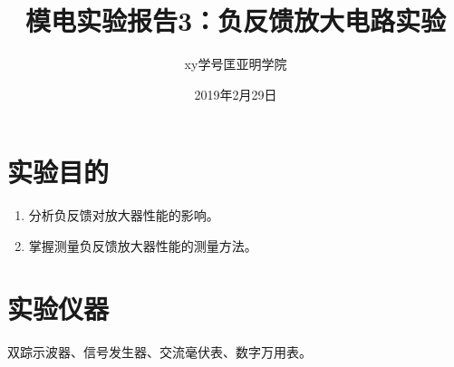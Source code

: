 \documentclass[a4paper]{article}
\title{模电实验报告3：负反馈放大电路实验}
\author{xy\quad 学号\quad 匡亚明学院}
\date{2019年2月29日}
\begin{document}
\maketitle


\section{实验目的}
\begin{enumerate}
\item 分析负反馈对放大器性能的影响。
\item 掌握测量负反馈放大器性能的测量方法。
\end{enumerate}

\section{实验仪器}
双踪示波器、信号发生器、交流毫伏表、数字万用表。
\end{document}
